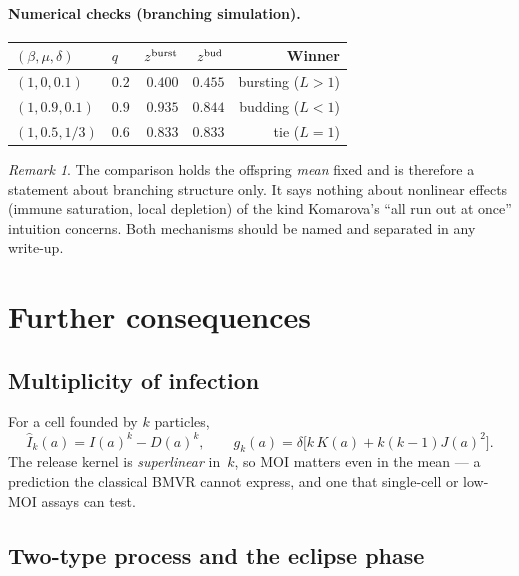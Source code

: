 \documentclass[11pt,a4paper]{article}
\newcommand{\Ihat}{\widehat{I}}
\theoremstyle{plain}
\theoremstyle{definition}
\theoremstyle{remark}
\newtheorem{remark}[result]{Remark}
\begin{document}
\paragraph{Numerical checks (branching simulation).}
\begin{center}
\renewcommand{\arraystretch}{1.2}
\begin{tabular}{@{}llrrr@{}}
\toprule
$(\beta,\mu,\delta)$ & $q$ & $z^{\rm burst}$ & $z^{\rm bud}$ & Winner \\
\midrule
$(1,0,0.1)$ & $0.2$ & $0.400$ & $0.455$ & bursting ($L>1$) \\
$(1,0.9,0.1)$ & $0.9$ & $0.935$ & $0.844$ & budding ($L<1$) \\
$(1,0.5,1/3)$ & $0.6$ & $0.833$ & $0.833$ & tie ($L=1$) \\
\bottomrule
\end{tabular}
\end{center}

\begin{remark}
The comparison holds the offspring \emph{mean} fixed and is therefore a
statement about branching structure only. It says nothing about nonlinear
effects (immune saturation, local depletion) of the kind Komarova's ``all run
out at once'' intuition concerns. Both mechanisms should be named and
separated in any write-up.
\end{remark}

\section{Further consequences}

\subsection{Multiplicity of infection}

For a cell founded by $k$ particles,
\[
\Ihat_k(a)=I(a)^k-D(a)^k,\qquad
g_k(a)=\delta\bigl[k\,K(a)+k(k-1)J(a)^2\bigr].
\]
The release kernel is \emph{superlinear} in~$k$, so MOI matters even in the
mean --- a prediction the classical BMVR cannot express, and one that single-cell
or low-MOI assays can test.

\subsection{Two-type process and the eclipse phase}
\end{document}
